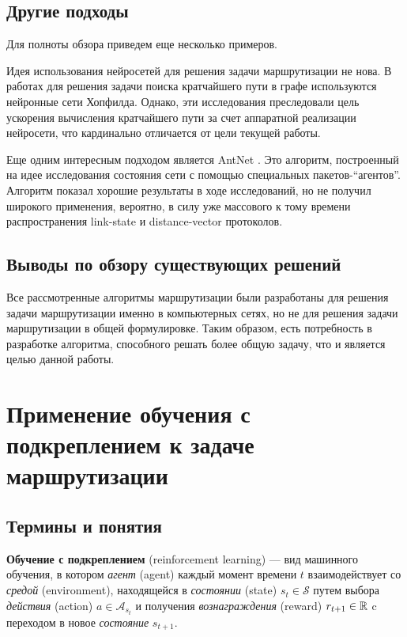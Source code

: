 \documentclass[specification, annotation]{itmo-student-thesis}
\begin{document}
\subsection{Другие подходы}

Для полноты обзора приведем еще несколько примеров.

Идея использования нейросетей для решения задачи маршрутизации не нова. В
работах \cite{ali-nn-routing, araujo2001neural} для решения задачи поиска кратчайшего пути в графе
используются нейронные сети Хопфилда. Однако, эти исследования преследовали цель
ускорения вычисления кратчайшего пути за счет аппаратной реализации нейросети,
что кардинально отличается от цели текущей работы.

Еще одним интересным подходом является AntNet \cite{di1998antnet}. Это алгоритм,
построенный на идее исследования состояния сети с помощью специальных
пакетов-``агентов''. Алгоритм показал хорошие результаты в ходе исследований, но
не получил широкого применения, вероятно, в силу уже массового к тому времени
распространения link-state и distance-vector протоколов.

\subsection{Выводы по обзору существующих решений}\label{routing-overview-end}

Все рассмотренные алгоритмы маршрутизации были разработаны для
решения задачи маршрутизации именно в компьютерных сетях, но не для решения
задачи маршрутизации в общей формулировке. Таким образом, есть потребность в
разработке алгоритма, способного решать более общую задачу, что и является целью
данной работы.

\section{Применение обучения с подкреплением к задаче маршрутизации}

\subsection{Термины и понятия}

\textbf{Обучение с подкреплением} (reinforcement learning) --- вид машинного
обучения, в котором \textit{агент} (agent) каждый момент времени $t$
взаимодействует со \textit{средой} (environment), находящейся в
\textit{состоянии} (state) $s_t \in \mathcal{S}$ путем выбора
\textit{действия} (action) $a \in \mathcal{A}_{s_t}$ и получения
\textit{вознаграждения} (reward) $r_{t+1} \in \Bbb{R}$ c переходом в новое
\textit{состояние} $s_{t+1}$.
\end{document}
